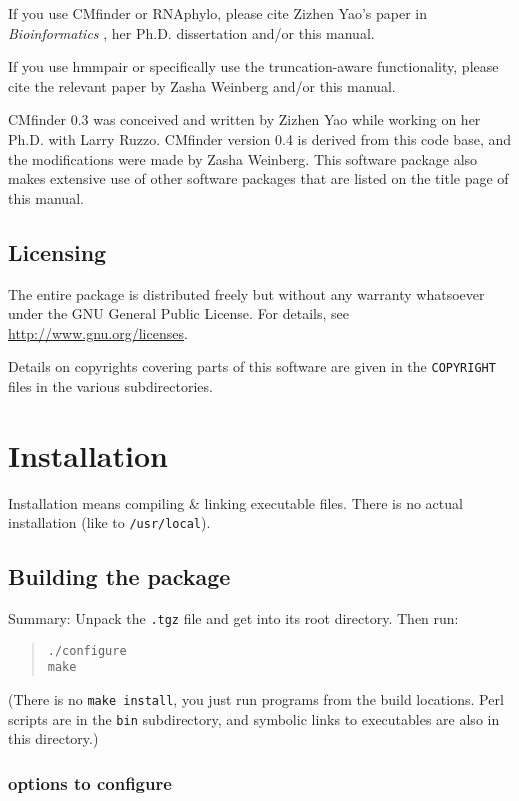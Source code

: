 \documentclass[letterpaper,12pt]{report}
\begin{document}
If you use CMfinder or RNAphylo, please cite Zizhen Yao's paper in {\it Bioinformatics} \cite{yao:cmfinder}, her Ph.D. dissertation \cite{ZizhenThesis} and/or this manual.

If you use hmmpair or specifically use the truncation-aware functionality, please cite the relevant paper by Zasha Weinberg \cite{MotifsTwoTwoFour} and/or this manual.

CMfinder 0.3 was conceived and written by Zizhen Yao while working on her Ph.D. with Larry Ruzzo.  CMfinder version 0.4 is derived from this code base, and the modifications were made by Zasha Weinberg.  This software package also makes extensive use of other software packages that are listed on the title page of this manual.

\section{Licensing}

The entire package is distributed freely but without any warranty whatsoever
under the GNU General Public License.
For details, see \url{http://www.gnu.org/licenses}.

Details on copyrights covering parts of this software are given in the {\tt COPYRIGHT} files in the various subdirectories.

\chapter{Installation}
\label{sec:install}

Installation means compiling \& linking executable files.  There is no actual installation (like to {\tt /usr/local}).

\section{Building the package}

Summary:
Unpack the {\tt .tgz} file and get into its root directory.  Then run:
\begin{quote}
{\tt ./configure}\\
{\tt make}
\end{quote}

(There is no {\tt make install}, you just run programs from the build locations.  Perl scripts are in the {\tt bin} subdirectory, and symbolic links to executables are also in this directory.)

\subsection{options to configure}
\end{document}
